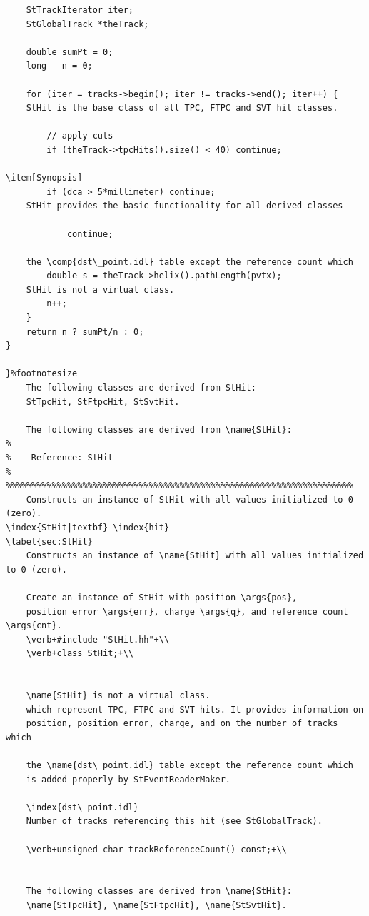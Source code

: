 \begin{Entry}
{\begin{verbatim}
    StTrackIterator iter;
    StGlobalTrack *theTrack;

    double sumPt = 0;
    long   n = 0;

    for (iter = tracks->begin(); iter != tracks->end(); iter++) {
    StHit is the base class of all TPC, FTPC and SVT hit classes.

        // apply cuts
        if (theTrack->tpcHits().size() < 40) continue;
    
\item[Synopsis] 
        if (dca > 5*millimeter) continue;
    StHit provides the basic functionality for all derived classes
    
            continue;

    the \comp{dst\_point.idl} table except the reference count which
        double s = theTrack->helix().pathLength(pvtx);
    StHit is not a virtual class.
        n++;
    }
    return n ? sumPt/n : 0;
}
    
}%footnotesize
    The following classes are derived from StHit: 
    StTpcHit, StFtpcHit, StSvtHit.

    The following classes are derived from \name{StHit}: 
%
%    Reference: StHit
%
%%%%%%%%%%%%%%%%%%%%%%%%%%%%%%%%%%%%%%%%%%%%%%%%%%%%%%%%%%%%%%%%%%%%
    Constructs an instance of StHit with all values initialized to 0 (zero).
\index{StHit|textbf} \index{hit}
\label{sec:StHit}
    Constructs an instance of \name{StHit} with all values initialized to 0 (zero).
    
    Create an instance of StHit with position \args{pos},
    position error \args{err}, charge \args{q}, and reference count \args{cnt}.
    \verb+#include "StHit.hh"+\\
    \verb+class StHit;+\\

        
    \name{StHit} is not a virtual class.
    which represent TPC, FTPC and SVT hits. It provides information on
    position, position error, charge, and on the number of tracks which
    
    the \name{dst\_point.idl} table except the reference count which
    is added properly by StEventReaderMaker.
    
    \index{dst\_point.idl}
    Number of tracks referencing this hit (see StGlobalTrack).
    
    \verb+unsigned char trackReferenceCount() const;+\\    

    
    The following classes are derived from \name{StHit}:
    \name{StTpcHit}, \name{StFtpcHit}, \name{StSvtHit}.
    

\end{verbatim}}
\end{Entry}
